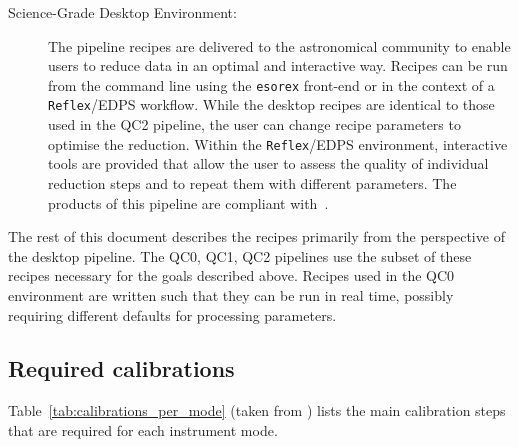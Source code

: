 \begin{description}
\item[Science-Grade Desktop Environment:] The pipeline recipes are
  delivered to the astronomical community to enable users to reduce
  data in an optimal and interactive way. Recipes can be run from the
  command line using the \lstinline{esorex} front-end or in the
  context of a \lstinline{Reflex}/\ac{EDPS} workflow. While the desktop recipes
  are identical to those used in the QC2 pipeline, the user can change
  recipe parameters to optimise the reduction. Within the
  \lstinline{Reflex}/\ac{EDPS} environment, interactive tools are provided that
  allow the user to assess the quality of individual reduction steps
  and to repeat them with different parameters. The products of this
  pipeline are compliant with~\cite{ESO-products_standard}.

\end{description}


The rest of this document describes the recipes primarily from the perspective of the desktop pipeline.
The QC0, QC1, QC2 pipelines use the subset of these recipes necessary for the goals described above.
Recipes used in the QC0 environment are written such that they can be run in real time, possibly requiring different defaults for processing parameters.


\subsection{Required calibrations}
\label{ssec:calibrations}

Table~\ref{tab:calibrations_per_mode} (taken from
\cite{METIS-calibration_plan}) lists the main calibration steps that
are required for each instrument mode.

